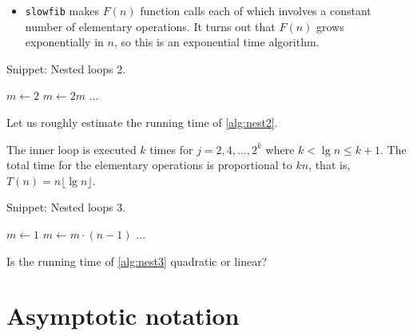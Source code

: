 \begin{frame}
\begin{itemize}[<+->]
\item \texttt{slowfib} makes $F(n)$ function calls each of which involves a
constant number of elementary operations. It turns out that $F(n)$ grows
exponentially in $n$, so this is an \alert{exponential time algorithm}.
\end{itemize}
\end{frame}
\fi


\begin{algorithm}[H]
  \caption{Snippet: Nested loops 2.}
  \label{alg:nest2}
\begin{algorithmic}[0]
\State $m \leftarrow 2$
		\State $m \leftarrow 2m$
			\State $\ldots$ 
		\EndFor
	\EndIf 
\EndFor
\end{algorithmic}
\end{algorithm}

\begin{Boxample}[6]
\label{exm:nest2}
Let us roughly estimate the running time of \cref{alg:nest2}.

The inner loop is executed $k$ times for $j=2, 4, \ldots, 2^{k}$
where $k < \lg n \le k+1$. The total time for the elementary operations is 
proportional to $kn$, that is, $T(n)=  n  \lfloor \lg n \rfloor$.    
\end{Boxample}


\begin{algorithm}[H]
  \caption{Snippet: Nested loops 3.}
  \label{alg:nest3}
\begin{algorithmic}[0]
\State $m \leftarrow 1$
		\State $m \leftarrow m \cdot (n-1)$
			\State $\ldots$ 
		\EndFor
	\EndIf
\EndFor 
\end{algorithmic}
\end{algorithm}

\begin{Boxample}[6]
\label{exm:nest1}
Is the running time of \cref{alg:nest3} quadratic or linear?
\end{Boxample}



\chapter{Asymptotic notation} %

